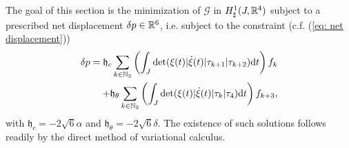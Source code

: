 The goal of this section is the minimization of $\mathcal{G}$ in $H_{\sharp}^1(J, \mathbb{R}^4)$ subject to a prescribed net displacement $\delta p \in \mathbb{R}^6$, i.e. subject to the constraint (c.f. (\ref{eq: net displacement}))
\begin{equation}
\label{eq: constraint}
\begin{aligned}
	 \delta p = \mathfrak{h}_{c} \sum_{k \in \mathbb{N}_3}\left ( \int_{J} \det( \xi(t) | \dot{\xi}(t) | \tau_{k+1} | \tau_{k+2}) \mathrm{d}t \right ) f_k\\
	+ \mathfrak{h}_{\theta}  \sum_{k \in \mathbb{N}_3}\left ( \int_{J} \det ( \xi(t) | \dot{\xi}(t) | \tau_{k} | \tau_{4}) \mathrm{d}t\right ) f_{k + 3},
\end{aligned}
\end{equation}
with $\mathfrak{h}_c = - 2 \sqrt{6} \alpha$ and $\mathfrak{h}_{\theta} = - 2 \sqrt{6} \delta$. The existence of such solutions follows readily by the direct method of variational calculus.


